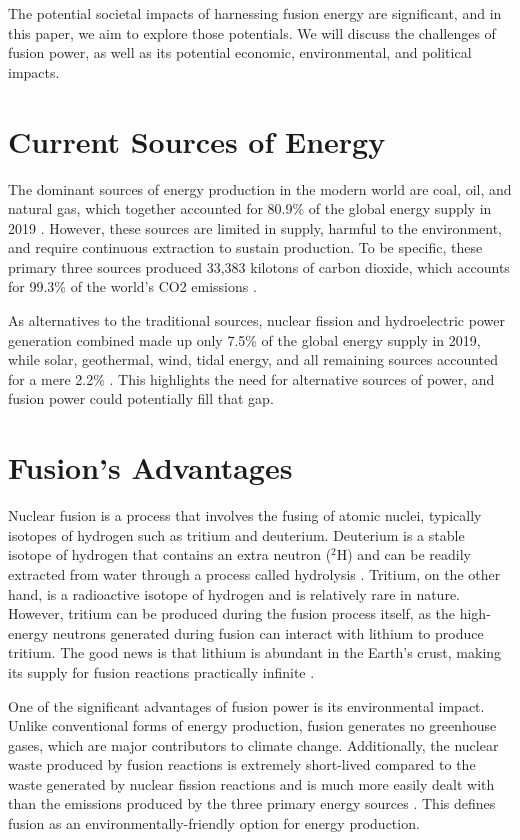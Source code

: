 \documentclass[12pt]{article}
\begin{document}
    The potential societal impacts of harnessing fusion energy are significant, and in this paper, we aim to explore those potentials. We will discuss the challenges of fusion power, as well as its potential economic, environmental, and political impacts.

    \section{Current Sources of Energy}

    The dominant sources of energy production in the modern world are coal, oil, and natural gas, which together accounted for 80.9\% of the global energy supply in 2019 \citep[Supply]{KWES}. However, these sources are limited in supply, harmful to the environment, and require continuous extraction to sustain production. To be specific, these primary three sources produced 33,383 kilotons of carbon dioxide, which accounts for 99.3\% of the world's CO2 emissions \citep[Emissions]{KWES}.

    As alternatives to the traditional sources, nuclear fission and hydroelectric power generation combined made up only 7.5\% of the global energy supply in 2019, while solar, geothermal, wind, tidal energy, and all remaining sources accounted for a mere 2.2\% \citep[Supply]{KWES}. This highlights the need for alternative sources of power, and fusion power could potentially fill that gap.

    \section{Fusion's Advantages}

    Nuclear fusion is a process that involves the fusing of atomic nuclei, typically isotopes of hydrogen such as tritium and deuterium. Deuterium is a stable isotope of hydrogen that contains an extra neutron ($^{2}$H) and can be readily extracted from water through a process called hydrolysis \citep{iaea_2022}. Tritium, on the other hand, is a radioactive isotope of hydrogen and is relatively rare in nature. However, tritium can be produced during the fusion process itself, as the high-energy neutrons generated during fusion can interact with lithium to produce tritium. The good news is that lithium is abundant in the Earth's crust, making its supply for fusion reactions practically infinite \citep{iaea_2022}.

    One of the significant advantages of fusion power is its environmental impact. Unlike conventional forms of energy production, fusion generates no greenhouse gases, which are major contributors to climate change. Additionally, the nuclear waste produced by fusion reactions is extremely short-lived compared to the waste generated by nuclear fission reactions and is much more easily dealt with than the emissions produced by the three primary energy sources \citep{iaea_2022}. This defines fusion as an environmentally-friendly option for energy production.
\end{document}
